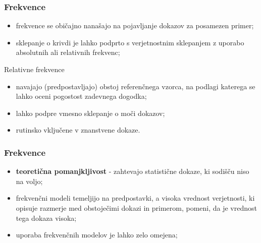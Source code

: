 \documentclass{beamer}
\begin{document}
\begin{frame}
    \frametitle{Frekvence}
    \begin{itemize}
        \item frekvence se običajno nanašajo na pojavljanje dokazov za posamezen primer;
        \item sklepanje o krivdi je lahko podprto s verjetnostnim sklepanjem z uporabo absolutnih ali relativnih frekvenc;
    \end{itemize}
    \begin{block}{Relativne frekvence}
        \begin{itemize}
            \item navajajo (predpostavljajo) obstoj referenčnega vzorca, na podlagi katerega se lahko oceni pogostost zadevnega dogodka;
            \item lahko podpre vmesno sklepanje o moči dokazov;
            \item rutinsko vključene v znanstvene dokaze.
        \end{itemize}  
    \end{block}
\end{frame}

\begin{frame}
    \frametitle{Frekvence}
    \begin{itemize}
        \item \textbf{teoretična pomanjkljivost} - zahtevajo statistične dokaze, ki sodišču niso na voljo;
        \item frekvenčni modeli temeljijo na predpostavki, a visoka vrednost verjetnosti, ki opisuje razmerje med obstoječimi dokazi in primerom, pomeni, da je vrednost tega dokaza visoka;
        \item uporaba frekvenčnih modelov je lahko zelo omejena;
    \end{itemize} \vspace{3mm}
\end{frame}
\end{document}
